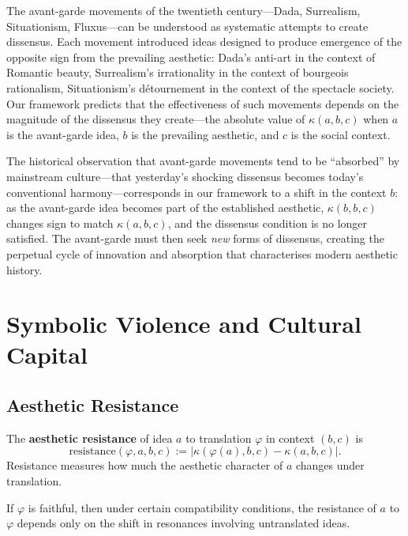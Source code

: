\begin{remark}
\label{rem:dissensus-avant-garde}
The avant-garde movements of the twentieth century---Dada, Surrealism, Situationism, Fluxus---can be understood as systematic attempts to create dissensus.  Each movement introduced ideas designed to produce emergence of the opposite sign from the prevailing aesthetic: Dada's anti-art in the context of Romantic beauty, Surrealism's irrationality in the context of bourgeois rationalism, Situationism's détournement in the context of the spectacle society.  Our framework predicts that the effectiveness of such movements depends on the magnitude of the dissensus they create---the absolute value of $\kappa(a, b, c)$ when $a$ is the avant-garde idea, $b$ is the prevailing aesthetic, and $c$ is the social context.

The historical observation that avant-garde movements tend to be ``absorbed'' by mainstream culture---that yesterday's shocking dissensus becomes today's conventional harmony---corresponds in our framework to a shift in the context $b$: as the avant-garde idea becomes part of the established aesthetic, $\kappa(b, b, c)$ changes sign to match $\kappa(a, b, c)$, and the dissensus condition is no longer satisfied.  The avant-garde must then seek \emph{new} forms of dissensus, creating the perpetual cycle of innovation and absorption that characterises modern aesthetic history.
\end{remark}

\section{Symbolic Violence and Cultural Capital}
\label{sec:adorno:bourdieu}

\subsection{Aesthetic Resistance}

\begin{definition}
\label{def:aesthetic-resistance}
The \textbf{aesthetic resistance} of idea $a$ to translation $\varphi$
in context $(b, c)$ is
\[
  \mathrm{resistance}(\varphi, a, b, c)
    := |\kappa(\varphi(a), b, c) - \kappa(a, b, c)|.
\]
Resistance measures how much the aesthetic character of $a$ changes
under translation.
\end{definition}

\begin{theorem}
\label{thm:faithful-zero-resistance}
If $\varphi$ is faithful, then under certain compatibility conditions,
the resistance of $a$ to $\varphi$ depends only on the shift in resonances
involving untranslated ideas.
\end{theorem}

